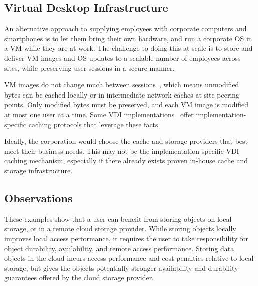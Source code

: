 
\subsection{Virtual Desktop Infrastructure}

An alternative approach to supplying employees with corporate computers and smartphones is to let them bring their own hardware, and run a corporate OS in a VM while they are at work. The challenge to doing this at scale is to store and deliver VM images and OS updates to a scalable number of employees across sites, while preserving user sessions in a secure manner.

VM images do not change much between sessions~\cite{collective}, which means unmodified bytes can be cached locally or in intermediate network caches at site peering points. Only modified bytes must be preserved, and each VM image is modified at most one user at a time. Some VDI implementations~\cite{citrix,mokafive} offer implementation-specific caching protocols that leverage these facts.

Ideally, the corporation would choose the cache and storage providers that best meet their business needs.  This may not be the implementation-specific VDI caching mechanism, especially if there already exists proven in-house cache and storage infrastructure.


\subsection{Observations}

These examples show that a user can benefit from storing objects on local storage, or in a remote cloud storage provider. While storing objects locally improves local access performance, it requires the user to take responsibility for object durability, availability, and remote access performance. Storing data objects in the cloud incurs access performance and cost penalties relative to local storage, but gives the objects potentially stronger availability and durability guarantees offered by the cloud storage provider.

